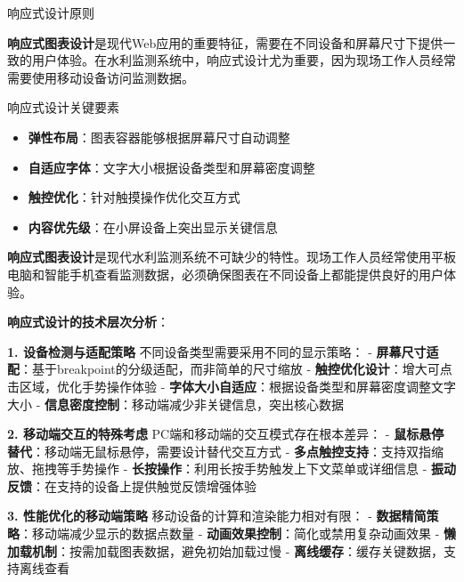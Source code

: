  响应式设计原则

\textbf{响应式图表设计}是现代Web应用的重要特征，需要在不同设备和屏幕尺寸下提供一致的用户体验。在水利监测系统中，响应式设计尤为重要，因为现场工作人员经常需要使用移动设备访问监测数据。

 响应式设计关键要素

\begin{itemize}
\tightlist
\item
  \textbf{弹性布局}：图表容器能够根据屏幕尺寸自动调整
\item
  \textbf{自适应字体}：文字大小根据设备类型和屏幕密度调整
\item
  \textbf{触控优化}：针对触摸操作优化交互方式
\item
  \textbf{内容优先级}：在小屏设备上突出显示关键信息
\end{itemize}

\textbf{响应式图表设计}是现代水利监测系统不可缺少的特性。现场工作人员经常使用平板电脑和智能手机查看监测数据，必须确保图表在不同设备上都能提供良好的用户体验。

\textbf{响应式设计的技术层次分析}：

\textbf{1. 设备检测与适配策略} 不同设备类型需要采用不同的显示策略： - \textbf{屏幕尺寸适配}：基于breakpoint的分级适配，而非简单的尺寸缩放 - \textbf{触控优化设计}：增大可点击区域，优化手势操作体验 - \textbf{字体大小自适应}：根据设备类型和屏幕密度调整文字大小 - \textbf{信息密度控制}：移动端减少非关键信息，突出核心数据

\textbf{2. 移动端交互的特殊考虑} PC端和移动端的交互模式存在根本差异： - \textbf{鼠标悬停替代}：移动端无鼠标悬停，需要设计替代交互方式 - \textbf{多点触控支持}：支持双指缩放、拖拽等手势操作 - \textbf{长按操作}：利用长按手势触发上下文菜单或详细信息 - \textbf{振动反馈}：在支持的设备上提供触觉反馈增强体验

\textbf{3. 性能优化的移动端策略} 移动设备的计算和渲染能力相对有限： - \textbf{数据精简策略}：移动端减少显示的数据点数量 - \textbf{动画效果控制}：简化或禁用复杂动画效果 - \textbf{懒加载机制}：按需加载图表数据，避免初始加载过慢 - \textbf{离线缓存}：缓存关键数据，支持离线查看

